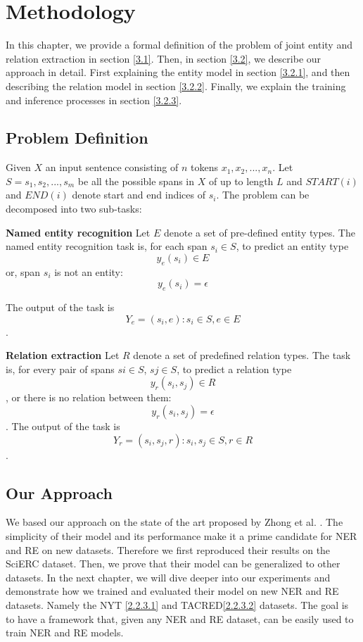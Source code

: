 \chapter{Methodology}
\label{chp:methodology}

In this chapter, we provide a formal definition of the problem of joint entity and relation extraction in section \hyperref[sec:probdef]{[3.1]}. Then, in section \hyperref[sec:approach]{[3.2]}, we describe our approach in detail. First explaining the entity model in section \hyperref[sec:entitymodel]{[3.2.1]}, and then describing the relation model in section \hyperref[sec:relationmodel]{[3.2.2]}. Finally, we explain the training and inference processes in section \hyperref[sec:relationmodel]{[3.2.3]}.
\section{Problem Definition}
\label{sec:probdef}
Given \(X\) an input sentence consisting of \(n\) tokens \(x_1,x_2,...,x_n\). Let \(S = {s_1, s_2,...,s_m}\) be all the possible spans in \(X\) of up to length \(L\) and \(START(i)\) and \(END(i)\) denote start and end indices of \(s_i\). The problem can be decomposed into two sub-tasks:

\textbf{Named entity recognition} Let \(E\) denote a set of pre-defined entity types. The named entity recognition task is, for each span \(s_i \in S\), to predict an entity type \[y_e(s_i) \in E\] or, span \(s_i\) is not an entity: \[y_e(s_i) =\epsilon\]

The output of the task is \[Y_e = {(s_i , e) : s_i \in S, e \in E}\].


\textbf{Relation extraction} Let \(R\) denote a set of predefined relation types. The task is, for every pair of spans \(si \in S\), \(sj \in S\), to predict a relation type \[y_r(s_i , s_j ) \in R\], or there is no relation between them: \[y_r(s_i , s_j ) =\epsilon\]. The output of the task is \[Y_r = {(s_i , s_j , r) : s_i , s_j \in S, r \in R}\].

\section{Our Approach}
\label{sec:approach}

We based our approach on the state of the art proposed by Zhong et al. \cite{Zhong2020AFE}. The simplicity of their model and its performance make it a prime candidate for NER and RE on new datasets. Therefore we first reproduced their results on the SciERC dataset. Then, we prove that their model can be generalized to other datasets. In the next chapter, we will dive deeper into our experiments and demonstrate how we trained and evaluated their model on new NER and RE datasets. Namely the NYT \hyperref[sec:nytdataset]{[2.2.3.1]} and TACRED\hyperref[sec:tacreddataset]{[2.2.3.2]} datasets. The goal is to have a framework that, given any NER and RE dataset, can be easily used to train NER and RE models.\\

